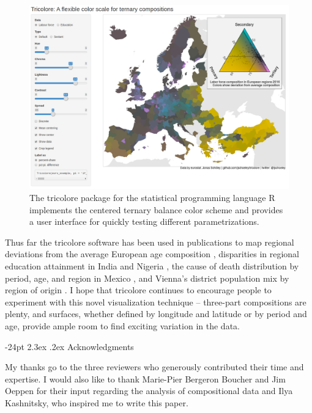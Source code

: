 \documentclass[10pt,twoside,reqno]{article}
\makeatletter
\def\cnstmaxfigwidth{
      \ifdim \Gin@nat@width>\linewidth
        \linewidth
      \else \Gin@nat@width
      \fi
    }
\let\Oldincludegraphics\includegraphics
\renewcommand{\includegraphics}[1]{\Oldincludegraphics[width=\cnstmaxfigwidth]{#1}}
\renewcommand\section{\@startsection {section}{1}{\z@}%
                                   {-24pt}%
                                   {2.3ex \@plus.2ex}%
                                   {\normalfont\large\bfseries}}
\makeatother
\begin{document}
\begin{figure}
\centering
\includegraphics{figure4.png}
\caption{The tricolore package for the statistical programming language
R implements the centered ternary balance color scheme and provides a
user interface for quickly testing different parametrizations.}
\end{figure}

Thus far the tricolore software has been used in publications to map
regional deviations from the average European age composition
\citep{Kashnitsky2018, Schoeley2019}, disparities in regional education
attainment in India and Nigeria \citep{Graetz2019}, the cause of death
distribution by period, age, and region in Mexico
\citep{Kashnitsky2019}, and Vienna's district population mix by region
of origin \citep{StadtWien2019}. I hope that tricolore continues to
encourage people to experiment with this novel visualization technique
-- three-part compositions are plenty, and surfaces, whether defined by
longitude and latitude or by period and age, provide ample room to find
exciting variation in the data.

\hypertarget{acknowledgments}{%
\section{Acknowledgments}\label{acknowledgments}}

My thanks go to the three reviewers who generously contributed their
time and expertise. I would also like to thank Marie-Pier Bergeron
Boucher and Jim Oeppen for their input regarding the analysis of
compositional data and Ilya Kashnitsky, who inspired me to write this
paper.


\newpage







\cleardoublepage
\end{document}
